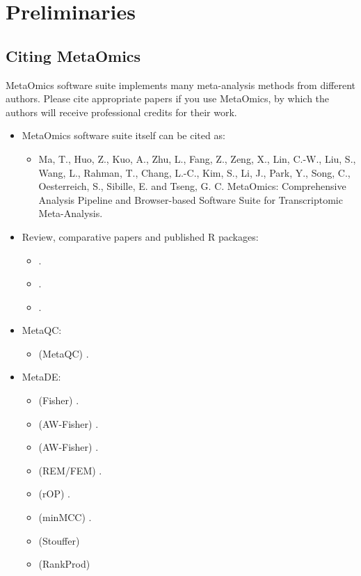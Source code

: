 \section{Preliminaries}
\subsection{Citing MetaOmics}
MetaOmics software suite implements many meta-analysis methods from different authors. 
Please cite appropriate papers if you use MetaOmics,
by which the authors will receive professional credits for their work.

\begin{itemize}

\item MetaOmics software suite itself can be cited as: 

\begin{itemize}
\item Ma, T., Huo, Z., Kuo, A., Zhu, L., Fang, Z., Zeng, X., Lin, C.-W., Liu, S., Wang, L., Rahman, T., Chang, L.-C., Kim, S., Li, J., Park, Y., Song, C., Oesterreich, S., Sibille, E. and Tseng, G. C. MetaOmics: Comprehensive Analysis Pipeline and Browser-based Software Suite for Transcriptomic Meta-Analysis.
\end{itemize}

\item Review, comparative papers and published R packages:
\begin{itemize}
\item {}.
\item {}.
\item {}.
\end{itemize}

\item MetaQC: 
\begin{itemize}
\item (MetaQC) .
\end{itemize}

\item MetaDE: 
\begin{itemize}
\item (Fisher) .
\item (AW-Fisher) .
\item (AW-Fisher) .
\item (REM/FEM) .
\item (rOP) .
\item (minMCC) .
\item (Stouffer) 
\item (RankProd)  
\end{itemize}


\end{itemize}
